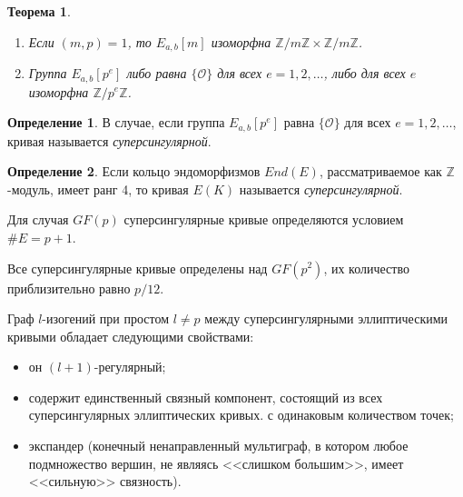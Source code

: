 \documentclass[a4paper,12pt]{article}
\newcommand{\ZZ}{\mathbb{Z}}
\newtheorem{theorem}{Теорема}
\theoremstyle{definition}
\newtheorem{definition}{Определение}
\newtheorem{example}{Пример}
\begin{document}
\begin{theorem}\label{thx}
 \begin{enumerate}
  \item Если $(m,p)=1$, то  $E_{a,b}[m]$ изоморфна $\ZZ/m\ZZ\times \ZZ/m\ZZ$.
  \item Группа $E_{a,b}[p^e] $ либо равна $\{\mathcal{O}\}$ для всех $e=1,2,\dots$, %
  либо для всех $e$  изоморфна $\ZZ/p^e\ZZ$.  
 \end{enumerate}
\end{theorem}

\begin{definition}
В случае, если группа $E_{a,b}[p^e] $  равна $\{\mathcal{O}\}$ для всех $e=1,2,\dots$, кривая называется \emph{суперсингулярной}.
\end{definition}

\begin{definition}
Если кольцо эндоморфизмов $End(E)$, рассматриваемое как $\ZZ$-модуль, имеет ранг 4, то кривая  $E(K)$ называется \emph{суперсингулярной}. 
\end{definition}


Для случая $GF(p)$ суперсингулярные кривые определяются условием $\#E=p+1$. %



Все суперсингулярные кривые определены над $GF(p^2)$, их количество приблизительно равно $p/12$.

Граф $l$-изогений при простом $l\neq p$ между суперсингулярными эллиптическими кривыми обладает следующими свойствами:
\begin{itemize}
 \item он $(l+1)$-регулярный;
 \item содержит единственный связный компонент, состоящий из всех суперсингулярных эллиптических кривых.  с одинаковым количеством точек;
\item экспандер (конечный ненаправленный мультиграф, в котором любое подмножество вершин, не являясь <<слишком большим>>, имеет <<сильную>> связность).
 \end{itemize}
\end{document}

